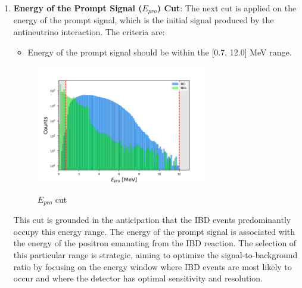 \begin{enumerate}
	\vspace{-1\baselineskip}

	\item \textbf{Energy of the Prompt Signal ($E_{pro}$) Cut}: The next cut is applied on the energy of the prompt signal, which is the initial signal produced by the antineutrino interaction. The criteria are:
	\begin{itemize}
		\item Energy of the prompt signal should be within the [0.7, 12.0] MeV range.
	\end{itemize}
	
	\begin{adjustbox}{minipage={\linewidth}, valign=t}
		
		\begin{figure}
			
			\vspace{-1\baselineskip}
			\caption{$E_{pro}$ cut}
			\vspace{-0.5\baselineskip}
			\includegraphics[width=7.5cm]{Images/Cut/e_pro.png}
			\label{fig:e_pto_cut}
			\vspace{-1\baselineskip}
			
		\end{figure}
		
		\vspace*{0.15cm}
		
		This cut is grounded in the anticipation that the IBD events predominantly occupy this energy range. The energy of the prompt signal is associated with the energy of the positron emanating from the IBD reaction. The selection of this particular range is strategic, aiming to optimize the signal-to-background ratio by focusing on the energy window where IBD events are most likely to occur and where the detector has optimal sensitivity and resolution.
		\\
		
	\end{adjustbox}



\end{enumerate}
